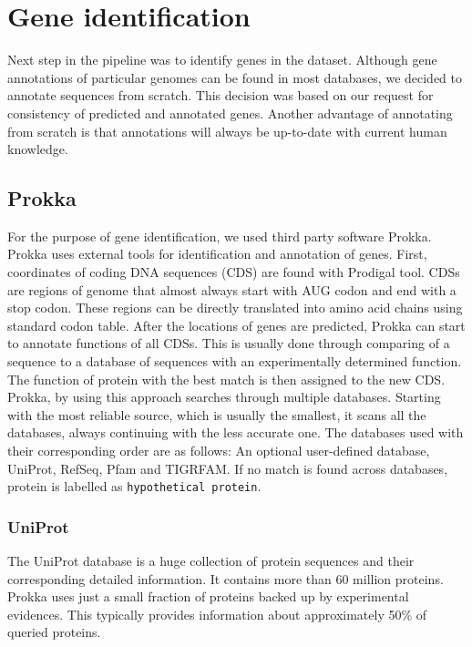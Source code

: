 \section{Gene identification}
Next step in the pipeline was to identify genes in the dataset.
Although gene annotations of particular genomes can be found in most databases, we decided to annotate sequences from scratch.
This decision was based on our request for consistency of predicted and annotated genes.
Another advantage of annotating from scratch is that annotations will always be up-to-date with current human knowledge.

\subsection{Prokka}
For the purpose of gene identification, we used third party software Prokka\cite{prokka}.
Prokka uses external tools for identification and annotation of genes.
First, coordinates of coding DNA sequences (CDS) are found with Prodigal tool\cite{prodigal}.
CDSs are regions of genome that almost always start with AUG codon and end with a stop codon.
These regions can be directly translated into amino acid chains using standard codon table.
After the locations of genes are predicted, Prokka can start to annotate functions of all CDSs.
This is usually done through comparing of a sequence to a database of sequences with an experimentally determined function.
The function of protein with the best match is then assigned to the new CDS.
Prokka, by using this approach searches through multiple databases.
Starting with the most reliable source, which is usually the smallest, it scans all the databases, always continuing with the less accurate one.
The databases used with their corresponding order are as follows:
An optional user-defined database, UniProt\cite{uniprot}, RefSeq\cite{refseq}, Pfam\cite{pfam} and TIGRFAM\cite{tigrfam}.
If no match is found across databases, protein is labelled as \verb|hypothetical protein|.


\subsubsection{UniProt}
The UniProt database is a huge collection of protein sequences and their corresponding detailed information.
It contains more than 60 million proteins.
Prokka uses just a small fraction of proteins backed up by experimental evidences.
This typically provides information about approximately 50\% of queried proteins.

